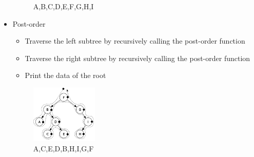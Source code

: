 \documentclass[12pt]{article}
\begin{document}
\begin{itemize}
\begin{figure}[h]
\caption{A,B,C,D,E,F,G,H,I}
\end{figure}
\item Post-order
\begin{itemize}
\item Traverse the left subtree by recursively calling the post-order function
\item Traverse the right subtree by recursively calling the post-order function
\item Print the data of the root
\end{itemize}
\begin{figure}[h]
\centering
\includegraphics[width=0.3\textwidth]{3.jpg}
\caption{A,C,E,D,B,H,I,G,F}
\end{figure}
\end{itemize}
\end{document}
